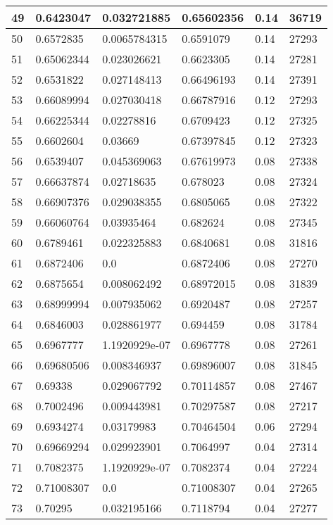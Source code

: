 \begin{longtable}{|l|l|l|l|l|l|}
49 & 0.6423047 & 0.032721885 & 0.65602356 & 0.14 & 36719 \\ \hline 
50 & 0.6572835 & 0.0065784315 & 0.6591079 & 0.14 & 27293 \\ \hline 
51 & 0.65062344 & 0.023026621 & 0.6623305 & 0.14 & 27281 \\ \hline 
52 & 0.6531822 & 0.027148413 & 0.66496193 & 0.14 & 27391 \\ \hline 
53 & 0.66089994 & 0.027030418 & 0.66787916 & 0.12 & 27293 \\ \hline 
54 & 0.66225344 & 0.02278816 & 0.6709423 & 0.12 & 27325 \\ \hline 
55 & 0.6602604 & 0.03669 & 0.67397845 & 0.12 & 27323 \\ \hline 
56 & 0.6539407 & 0.045369063 & 0.67619973 & 0.08 & 27338 \\ \hline 
57 & 0.66637874 & 0.02718635 & 0.678023 & 0.08 & 27324 \\ \hline 
58 & 0.66907376 & 0.029038355 & 0.6805065 & 0.08 & 27322 \\ \hline 
59 & 0.66060764 & 0.03935464 & 0.682624 & 0.08 & 27345 \\ \hline 
60 & 0.6789461 & 0.022325883 & 0.6840681 & 0.08 & 31816 \\ \hline 
61 & 0.6872406 & 0.0 & 0.6872406 & 0.08 & 27270 \\ \hline 
62 & 0.6875654 & 0.008062492 & 0.68972015 & 0.08 & 31839 \\ \hline 
63 & 0.68999994 & 0.007935062 & 0.6920487 & 0.08 & 27257 \\ \hline 
64 & 0.6846003 & 0.028861977 & 0.694459 & 0.08 & 31784 \\ \hline 
65 & 0.6967777 & 1.1920929e-07 & 0.6967778 & 0.08 & 27261 \\ \hline 
66 & 0.69680506 & 0.008346937 & 0.69896007 & 0.08 & 31845 \\ \hline 
67 & 0.69338 & 0.029067792 & 0.70114857 & 0.08 & 27467 \\ \hline 
68 & 0.7002496 & 0.009443981 & 0.70297587 & 0.08 & 27217 \\ \hline 
69 & 0.6934274 & 0.03179983 & 0.70464504 & 0.06 & 27294 \\ \hline 
70 & 0.69669294 & 0.029923901 & 0.7064997 & 0.04 & 27314 \\ \hline 
71 & 0.7082375 & 1.1920929e-07 & 0.7082374 & 0.04 & 27224 \\ \hline 
72 & 0.71008307 & 0.0 & 0.71008307 & 0.04 & 27265 \\ \hline 
73 & 0.70295 & 0.032195166 & 0.7118794 & 0.04 & 27277 \\ \hline 

\end{longtable}
